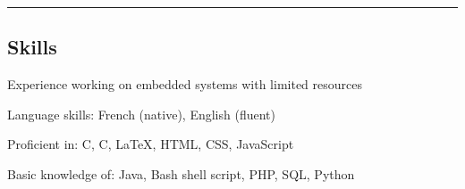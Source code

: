 \documentclass[11pt,a4paper]{article}
\newenvironment{indentsection}[1]%
{\begin{list}{}%
	{\setlength{\leftmargin}{#1}}%
	\item[]%
}
{\end{list}}
\newcommand{\Cplusplus}
{C\nolinebreak[4]\hspace{-.05em}\raisebox{.22ex}{\footnotesize\bf ++}}
\begin{document}
\hrule
\vspace{-0.4em}
\subsection*{Skills}

\begin{indentsection}{\parindent}
\begin{description*}
	\item[Experience working on embedded systems with limited resources]
	\item[Language skills:]
	French (native), English (fluent)
	\item[Proficient in:]
	C, \Cplusplus, \LaTeX, HTML, CSS, JavaScript
	\item[Basic knowledge of:]
	Java, Bash shell script, PHP, SQL, Python
\end{description*}
\end{indentsection}
\end{document}
